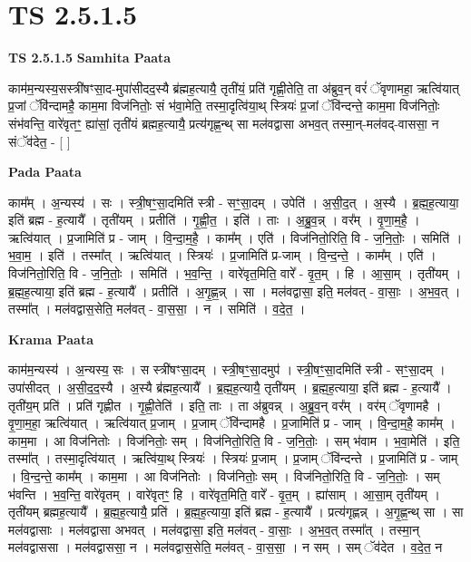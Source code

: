\documentclass[17pt]{extarticle}
\begin{document}
\section{ TS 2.5.1.5 }

\textbf{TS 2.5.1.5 } \newline
\textbf{Samhita Paata} \newline

काम॑म॒न्यस्य॒सस्त्री॑षꣳसा॒द-मुपा॑सीदद॒स्यै ब्र॑ह्मह॒त्यायै॒ तृती॑यं॒ प्रति॑ गृह्णी॒तेति॒ ता अ॑ब्रुव॒न् वरं॑ ॅवृणामहा॒ ऋत्वि॑यात् प्र॒जां ॅवि॑न्दामहै॒ काम॒मा विज॑नितोः॒ सं भ॑वा॒मेति॒ तस्मा॒दृत्वि॑या॒थ् स्त्रियः॑ प्र॒जां ॅवि॑न्दन्ते॒ काम॒मा विज॑नितोः॒ संभ॑वन्ति॒ वारे॑वृतꣳ॒॒ ह्या॑सां॒ तृती॑यं ब्रह्मह॒त्यायै॒ प्रत्य॑गृह्ण॒न्थ् सा मल॑वद्वासा अभव॒त् तस्मा॒न्-मल॑वद्-वाससा॒ न संॅव॑देत॒ - [  ] \newline

\textbf{Pada Paata} \newline

काम᳚म् । अ॒न्यस्य॑ । सः । स्त्री॒षꣳ॒॒सा॒दमिति॑ स्त्री - सꣳ॒॒सा॒दम् । उपेति॑ । अ॒सी॒द॒त् । अ॒स्यै । ब्र॒ह्म॒ह॒त्याया॒ इति॑ ब्रह्म - ह॒त्यायै᳚ । तृती॑यम् । प्रतीति॑ । गृ॒ह्णी॒त॒ । इति॑ । ताः । अ॒ब्रु॒व॒न्न् । वर᳚म् । वृ॒णा॒म॒है॒ । ऋत्वि॑यात् । प्र॒जामिति॑ प्र - जाम् । वि॒न्दा॒म॒है॒ । काम᳚म् । एति॑ । विज॑नितो॒रिति॒ वि - ज॒नि॒तोः॒ । समिति॑ । भ॒वा॒म॒ । इति॑ । तस्मा᳚त् । ऋत्वि॑यात् । स्त्रियः॑ । प्र॒जामिति॑ प्र-जाम् । वि॒न्द॒न्ते॒ । काम᳚म् । एति॑ । विज॑नितो॒रिति॒ वि - ज॒नि॒तोः॒ । समिति॑ । भ॒व॒न्ति॒ । वारे॑वृत॒मिति॒ वारे᳚ - वृ॒त॒म् । हि । आ॒सा॒म् । तृती॑यम् । ब्र॒ह्म॒ह॒त्याया॒ इति॑ ब्रह्म - ह॒त्यायै᳚ । प्रतीति॑ । अ॒गृ॒ह्ण॒न्न् । सा । मल॑वद्वासा॒ इति॒ मल॑वत् - वा॒साः॒ । अ॒भ॒व॒त् । तस्मा᳚त् । मल॑वद्वास॒सेति॒ मल॑वत् - वा॒स॒सा॒ । न । समिति॑ । व॒दे॒त॒ ।  \newline


\textbf{Krama Paata} \newline

काम॑म॒न्यस्य॑ । अ॒न्यस्य॒ सः । स स्त्री॑षꣳसा॒दम् । स्त्री॒षꣳ॒॒सा॒दमुप॑ । स्त्री॒षꣳ॒॒सा॒दमिति॑ स्त्री - सꣳ॒॒सा॒दम् । उपा॑सीदत् । अ॒सी॒द॒द॒स्यै । अ॒स्यै ब्र॑ह्मह॒त्यायै᳚ । ब्र॒ह्म॒ह॒त्यायै॒ तृती॑यम् । ब्र॒ह्म॒ह॒त्याया॒ इति॑ ब्रह्म - ह॒त्यायै᳚ । तृती॑य॒म् प्रति॑ । प्रति॑ गृह्णीत । गृ॒ह्णी॒तेति॑ । इति॒ ताः । ता अ॑ब्रुवन्न् । अ॒ब्रु॒व॒न् वर᳚म् । वर॑म् ॅवृणामहै । वृ॒णा॒म॒हा॒ ऋत्वि॑यात् । ऋत्वि॑यात् प्र॒जाम् । प्र॒जाम् ॅवि॑न्दामहै । प्र॒जामिति॑ प्र - जाम् । वि॒न्दा॒म॒है॒ काम᳚म् । काम॒मा । आ विज॑नितोः । विज॑नितोः॒ सम् । विज॑नितो॒रिति॒ वि - ज॒नि॒तोः॒ । सम् भ॑वाम । भ॒वा॒मेति॑ । इति॒ तस्मा᳚त् । तस्मा॒दृत्वि॑यात् । ऋत्वि॑या॒थ् स्त्रियः॑ । स्त्रियः॑ प्र॒जाम् । प्र॒जाम् ॅवि॑न्दन्ते । प्र॒जामिति॑ प्र - जाम् । वि॒न्द॒न्ते॒ काम᳚म् । काम॒मा । आ विज॑नितोः । विज॑नितोः॒ सम् । विज॑नितो॒रिति॒ वि - ज॒नि॒तोः॒ । सम् भ॑वन्ति । भ॒व॒न्ति॒ वारे॑वृतम् । वारे॑वृतꣳ॒॒ हि । वारे॑वृत॒मिति॒ वारे᳚ - वृ॒त॒म् । ह्या॑साम् । आ॒सा॒म् तृती॑यम् । तृती॑यम् ब्रह्मह॒त्यायै᳚ । ब्र॒ह्म॒ह॒त्यायै॒ प्रति॑ । ब्र॒ह्म॒ह॒त्याया॒ इति॑ ब्रह्म - ह॒त्यायै᳚ । प्रत्य॑गृह्णन्न् । अ॒गृ॒ह्ण॒न्थ् सा । सा मल॑वद्वासाः । मल॑वद्वासा अभवत् । मल॑वद्वासा॒ इति॒ मल॑वत् - वा॒साः॒ । अ॒भ॒व॒त् तस्मा᳚त् । तस्मा॒न् मल॑वद्वाससा । मल॑वद्वाससा॒ न । मल॑वद्वास॒सेति॒ मल॑वत् - वा॒स॒सा॒ । न सम् । सम् ॅव॑देत । व॒दे॒त॒ न \newline
\end{document}
